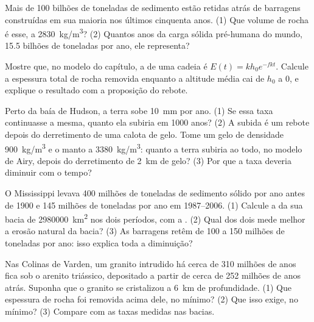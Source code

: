 \begin{exercise}[$\star\star$]\label{exo:g12:destruction-of-mountains:11}
Mais de 100 bilhões de toneladas de sedimento estão retidas atrás de
barragens construídas em sua maioria nos últimos cinquenta anos. (1) Que
volume de rocha é esse, a
\qty{2830}{kg/m^3}? (2) Quantos anos da carga sólida pré-humana do mundo,
15.5 bilhões de toneladas por ano, ele representa?
\end{exercise}

\begin{exercise}[$\star\star\star$]\label{exo:g12:destruction-of-mountains:12}
Mostre que, no modelo do capítulo, a  de uma cadeia é
$E(t) = k h_0 e^{-fkt}$. Calcule a espessura total de rocha removida enquanto
a altitude média cai de $h_0$ a 0, e explique o resultado com a
proposição do rebote.
\end{exercise}

\begin{exercise}[$\star\star\star$]\label{exo:g12:destruction-of-mountains:13}
Perto da baía de Hudson, a terra sobe \qty{10}{mm} por ano. (1) Se essa taxa
continuasse a mesma, quanto ela subiria em 1000 anos? (2) A subida é um
rebote depois do derretimento de uma calota de gelo. Tome um gelo de
densidade \qty{900}{kg/m^3} e o manto a \qty{3380}{kg/m^3}: quanto a terra
subiria ao todo, no modelo de Airy, depois do derretimento de \qty{2}{km} de
gelo? (3) Por que a taxa deveria diminuir com o tempo?
\end{exercise}

\begin{exercise}[$\star\star\star$]\label{exo:g12:destruction-of-mountains:14}
O Mississippi levava 400 milhões de toneladas de sedimento sólido por ano
antes de 1900 e 145 milhões de toneladas por ano em 1987--2006. (1) Calcule
a  da sua bacia de \qty{2980000}{km^2} nos dois períodos,
com a . (2) Qual dos dois mede melhor a erosão natural da
bacia? (3) As barragens retêm de 100 a 150 milhões de toneladas por ano:
isso explica toda a diminuição?
\end{exercise}

\begin{exercise}[$\star\star\star$]\label{exo:g12:destruction-of-mountains:15}
Nas Colinas de Varden, um granito intrudido há cerca de 310 milhões de anos
fica sob o arenito triássico, depositado a partir de cerca de 252 milhões de
anos atrás. Suponha que o granito se cristalizou a \qty{6}{km} de
profundidade. (1) Que espessura de rocha foi removida acima dele, no mínimo?
(2) Que  isso exige, no mínimo? (3) Compare com as
taxas medidas nas bacias.
\end{exercise}

